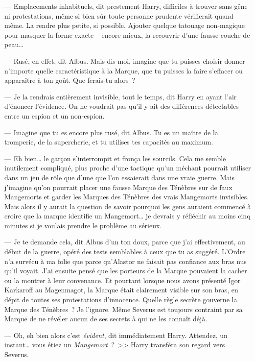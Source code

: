 --- Emplacements inhabituels, dit prestement Harry, difficiles à trouver sans gêne ni protestations, même si bien sûr toute personne prudente vérifierait quand même. La rendre plus petite, si possible. Ajouter quelque tatouage non-magique pour masquer la forme exacte -- encore mieux, la recouvrir d'une fausse couche de peau…

--- Rusé, en effet, dit Albus. Mais dis-moi, imagine que tu puisses choisir donner n'importe quelle caractéristique à la Marque, que tu puisses la faire s'effacer ou apparaître à ton goût. Que ferais-tu alors~?

--- Je la rendrais entièrement invisible, tout le temps, dit Harry en ayant l'air d'énoncer l'évidence. On ne voudrait pas qu'il y ait des différences détectables entre un espion et un non-espion.

--- Imagine que tu es encore plus rusé, dit Albus. Tu es un maître de la tromperie, de la supercherie, et tu utilises tes capacités au maximum.

--- Eh bien… le garçon s'interrompit et fronça les sourcils. Cela me semble inutilement compliqué, plus proche d'une tactique qu'un méchant pourrait utiliser dans un jeu de rôle que d'une que l'on essaierait dans une vraie guerre. Mais j'imagine qu'on pourrait placer une fausse Marque des Ténèbres sur de faux Mangemorts et garder les Marques des Ténèbres des vrais Mangemorts invisibles. Mais alors il y aurait la question de savoir pourquoi les gens auraient commencé à croire que la marque identifie un Mangemort… je devrais y réfléchir au moins cinq minutes si je voulais prendre le problème au sérieux.

--- Je te demande cela, dit Albus d'un ton doux, parce que j'ai effectivement, au début de la guerre, opéré des tests semblables à ceux que tu as suggéré. L'Ordre n'a survécu à ma folie que parce qu'Alastor ne faisait pas confiance aux bras nus qu'il voyait. J'ai ensuite pensé que les porteurs de la Marque pouvaient la cacher ou la montrer à leur convenance. Et pourtant lorsque nous avons présenté Igor Karkaroff au Magenmagot, la Marque était clairement visible sur son bras, en dépit de toutes ses protestations d'innocence. Quelle règle secrète gouverne la Marque des Ténèbres~? Je l'ignore. Même Severus est toujours contraint par sa Marque de ne révéler aucun de ses secrets à qui ne les connaît déjà.

--- Oh, eh bien alors c'est \emph{évident}, dit immédiatement Harry. Attendez, un instant… vous étiez un \emph{Mangemort}~?~>> Harry transféra son regard vers Severus.

